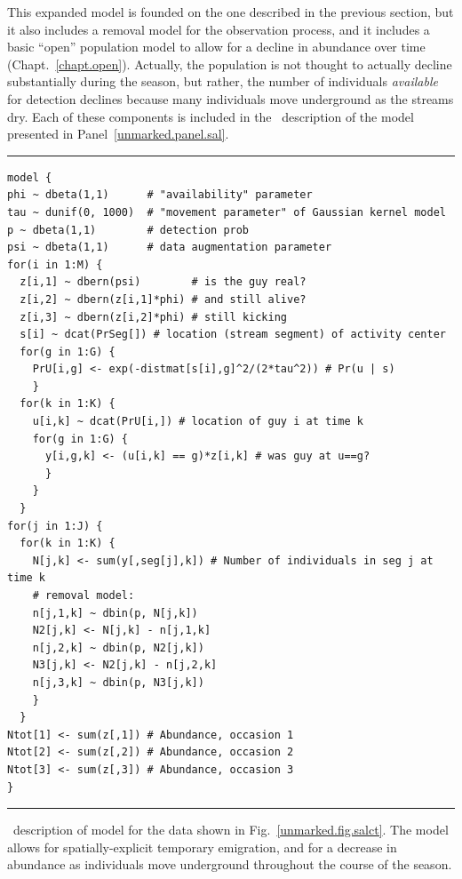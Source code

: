 This expanded model is founded on the one described in the previous
section, but it also includes a removal model for the observation
process, and it includes a basic ``open'' population model to allow
for a decline in abundance over time
(Chapt.~\ref{chapt.open}). Actually, the population is not thought to
actually decline substantially during the season, but rather, the
number of individuals \textit{available} for detection declines
because many individuals move underground as the streams dry. Each of
these components is included in the \bugs~description of the
model presented in Panel~\ref{unmarked.panel.sal}.


\begin{panel}[ht]
\centering
\rule[0.05in]{\textwidth}{.03in}
\begin{small}
\begin{verbatim}
model {
phi ~ dbeta(1,1)      # "availability" parameter
tau ~ dunif(0, 1000)  # "movement parameter" of Gaussian kernel model
p ~ dbeta(1,1)        # detection prob
psi ~ dbeta(1,1)      # data augmentation parameter
for(i in 1:M) {
  z[i,1] ~ dbern(psi)        # is the guy real?
  z[i,2] ~ dbern(z[i,1]*phi) # and still alive?
  z[i,3] ~ dbern(z[i,2]*phi) # still kicking
  s[i] ~ dcat(PrSeg[]) # location (stream segment) of activity center
  for(g in 1:G) {
    PrU[i,g] <- exp(-distmat[s[i],g]^2/(2*tau^2)) # Pr(u | s)
    }
  for(k in 1:K) {
    u[i,k] ~ dcat(PrU[i,]) # location of guy i at time k
    for(g in 1:G) {
      y[i,g,k] <- (u[i,k] == g)*z[i,k] # was guy at u==g?
      }
    }
  }
for(j in 1:J) {
  for(k in 1:K) {
    N[j,k] <- sum(y[,seg[j],k]) # Number of individuals in seg j at time k
    # removal model:
    n[j,1,k] ~ dbin(p, N[j,k])
    N2[j,k] <- N[j,k] - n[j,1,k]
    n[j,2,k] ~ dbin(p, N2[j,k])
    N3[j,k] <- N2[j,k] - n[j,2,k]
    n[j,3,k] ~ dbin(p, N3[j,k])
    }
  }
Ntot[1] <- sum(z[,1]) # Abundance, occasion 1
Ntot[2] <- sum(z[,2]) # Abundance, occasion 2
Ntot[3] <- sum(z[,3]) # Abundance, occasion 3
}
\end{verbatim}
\end{small}
\rule[0.05in]{\textwidth}{.03in}
\caption{\bugs~description of model for the data shown in
  Fig.~\ref{unmarked.fig.salct}. The model allows for
  spatially-explicit temporary emigration, and for a decrease in
  abundance as individuals move underground throughout the course of
  the season.}
\label{unmarked.panel.sal}
\end{panel}

